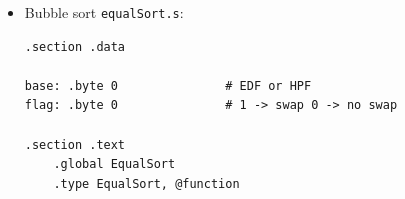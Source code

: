 \documentclass[a4paper]{report}
\begin{document}
\begin{itemize}
\begin{lstlisting}[firstnumber=1]
    movl 8(%ebp), %edi # edi = Arr[fine]
    movl 12(%ebp), %esi # esi = Arr[inizio]
    movl 16(%ebp), %ecx # Metodo di sorting (+3 Priorità, +2 Scadenza)

    popl %ebp

    movl %ecx, base

    xorl %ecx, %ecx # i = 0
    xorl %edx, %edx # j = 0
    addl base, %ecx # %ecx punta alla priorità/scadenza 
    addl $4, %ecx  # %punta a 2 oggetto (1)

for:

    cmpl %ecx, %edi
    jle endFor

    movl (%esi, %ecx, 1), %eax
    movb %al, key 
    subl base, %ecx
    movl (%esi, %ecx, 1), %eax
    push %eax
    addl base, %ecx

    movl %ecx, %edx # j = i
    addl $-4, %edx # j = i - 1

while:

    cmpl $0, %edx
    jl PrepEndWhile

    movb (%esi,%edx,1), %al

    cmpb %al, key
    jg PrepEndWhile

    subl base, %edx
    movl %edx, %eax
    addl $4, %eax
    movl (%esi ,%edx,1), %ebx
    movl %ebx, (%esi ,%eax,1)
    decl %edx

    cmpl $3, base
    je while

    decl %edx

    jmp while

PrepEndWhile:

    incl %edx

    cmpl $3, base
    je endWhile

    incl %edx

endWhile:

    popl %eax
    movl %eax, (%esi ,%edx, 1)

    addl $4, %ecx

    jmp for

endFor:

    ret
    \end{lstlisting}
    
    \item Bubble sort \texttt{equalSort.s}:
    
    \begin{lstlisting}[firstnumber=1]
.section .data

base: .byte 0               # EDF or HPF
flag: .byte 0               # 1 -> swap 0 -> no swap

.section .text
    .global EqualSort
    .type EqualSort, @function


\end{lstlisting}
\end{itemize}
\end{document}
